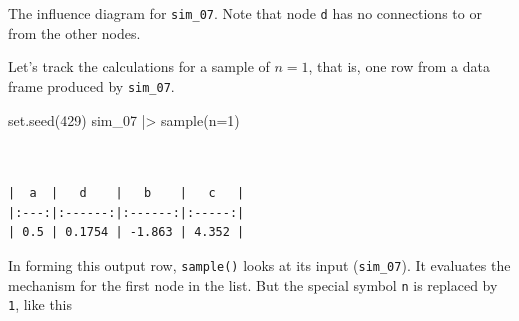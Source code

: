 \documentclass[
  letterpaper,
  DIV=11,
  numbers=noendperiod,
  oneside]{scrartcl}
\newenvironment{Shaded}{\begin{snugshade}}{\end{snugshade}}
\newcommand{\AttributeTok}[1]{\textcolor[rgb]{0.40,0.45,0.13}{#1}}
\newcommand{\DecValTok}[1]{\textcolor[rgb]{0.68,0.00,0.00}{#1}}
\newcommand{\FunctionTok}[1]{\textcolor[rgb]{0.28,0.35,0.67}{#1}}
\newcommand{\NormalTok}[1]{\textcolor[rgb]{0.00,0.23,0.31}{#1}}
\newcommand{\SpecialCharTok}[1]{\textcolor[rgb]{0.37,0.37,0.37}{#1}}
\begin{document}
\begin{marginfigure}


\caption{\label{fig-sim07-influence}The influence diagram for
\texttt{sim\_07}. Note that node \texttt{d} has no connections to or
from the other nodes.}

\end{marginfigure}%

Let's track the calculations for a sample of \(n=1\), that is, one row
from a data frame produced by \texttt{sim\_07}.

\begin{Shaded}
\begin{Highlighting}[]
\FunctionTok{set.seed}\NormalTok{(}\DecValTok{429}\NormalTok{)}
\NormalTok{sim\_07 }\SpecialCharTok{|\textgreater{}} \FunctionTok{sample}\NormalTok{(}\AttributeTok{n=}\DecValTok{1}\NormalTok{)}
\end{Highlighting}
\end{Shaded}

\begin{verbatim}


|  a  |   d    |   b    |   c   |
|:---:|:------:|:------:|:-----:|
| 0.5 | 0.1754 | -1.863 | 4.352 |
\end{verbatim}

In forming this output row, \texttt{sample()} looks at its input
(\texttt{sim\_07}). It evaluates the mechanism for the first node in the
list. But the special symbol \texttt{n} is replaced by \texttt{1}, like
this
\end{document}
